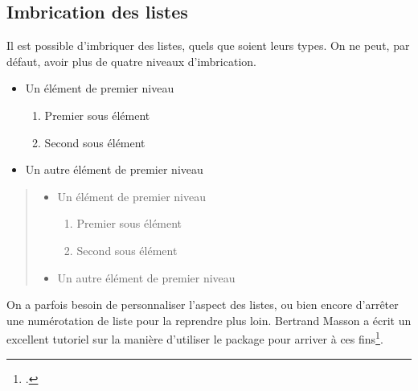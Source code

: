\subsection{Imbrication des listes}

Il est possible d'imbriquer des listes, quels que soient leurs types. On ne peut, par défaut, avoir plus de quatre niveaux d'imbrication.

\begin{latexcode}
\begin{itemize}
    \item Un élément de premier niveau
    \begin{enumerate}
            \item Premier sous élément
            \item Second sous élément
    \end{enumerate}
    \item Un autre élément de premier niveau
\end{itemize}
\end{latexcode}

\begin{quotation}
\begin{itemize}
    \item Un élément de premier niveau
    \begin{enumerate}
            \item Premier sous élément
            \item Second sous élément
    \end{enumerate}
    \item Un autre élément de premier niveau
\end{itemize}
\end{quotation}

\begin{plusloins}
On a parfois besoin de personnaliser l'aspect des listes, ou bien encore d'arrêter une numérotation de liste pour la reprendre plus loin. Bertrand Masson a écrit un excellent tutoriel sur la manière d'utiliser le package  pour arriver à ces fins\footcite{bebert_liste}. 
\end{plusloins}
